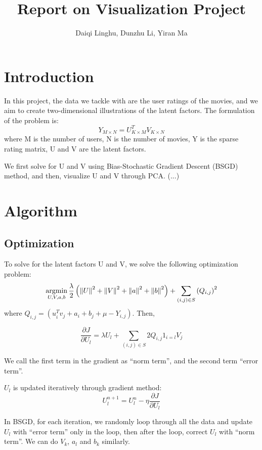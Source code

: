 \documentclass[12pt]{article}
\title{Report on Visualization Project}
\author{Daiqi Linghu, Dunzhu Li, Yiran Ma}
\date{} %
\newcommand{\argmin}{\operatornamewithlimits{argmin}}
\newcommand\norm[1]{\left\lVert#1\right\rVert}
\begin{document}
\maketitle

\section{Introduction}
In this project, the data we tackle with are the user ratings of the movies, and we aim to create two-dimensional illustrations of the latent factors. The formulation of the problem is:
\begin{equation*}
Y_{M\times N} = U_{K\times M}^{T} V_{K\times N}
\end{equation*}
where M is the number of users, N is the number of movies, Y is the sparse rating matrix, U and V are the latent factors. 

We first solve for U and V using Bias-Stochastic Gradient Descent (BSGD) method, and then, visualize U and V through PCA.  (...)

\section{Algorithm}
\subsection{Optimization}
To solve for the latent factors U and V, we solve the following optimization problem:
\begin{equation*}
\argmin_{U,V,a,b}\frac{\lambda}{2}\left(\norm{U}^2+\norm{V}^2+\norm{a}^2+\norm{b}^2\right)+
\sum_{(i,j)\in S}\left(  Q_{i,j}  \right)^2
\end{equation*}
where $Q_{i,j}=(u_i^T v_j + a_i + b_j +\mu-Y_{i,j})$. Then,

\begin{equation*}
\frac{\partial{J}}{\partial{U_{l}}}=\lambda U_{l}+\sum_{(i,j)\in S}2Q_{i,j}1_{i=l}V_{j}
\end{equation*}

We call the first term in the gradient as ``norm term'', and the second term ``error term''.

$U_{l}$ is updated iteratively through gradient method:
\begin{equation*}
U_{l}^{n+1}=U_{l}^{n}-\eta \frac{\partial{J}}{\partial{U_{l}}}
\end{equation*}

In BSGD, for each iteration, we randomly loop through all the data and update $U_{l}$ with ``error term'' only in the loop, then after the loop, correct $U_{l}$ with ``norm term''. We can do $V_{k}$, $a_{l}$ and $b_{k}$ similarly.
\end{document}

